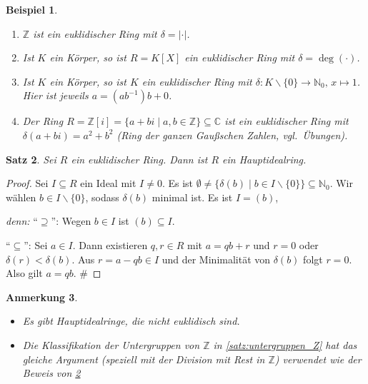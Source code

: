 \documentclass[a4paper, twoside, 11pt, ngerman]{report}
\newcommand{\CC}{\mathds C}
\newcommand{\NN}{\mathds N}
\newcommand{\ZZ}{\mathds Z}
\renewcommand{\setminus}{\smallsetminus}
\theoremstyle{definistyle}
\newtheorem{satz}{Satz}[section]
\newtheorem{anm}[satz]{Anmerkung}
\newtheorem{bsp}[satz]{Beispiel}
\theoremstyle{remark}
\newenvironment{denn}%
  {\par\textit{denn:}}%
  {\hfill\#\par}
\begin{document}
\begin{bsp}\label{bsp:euklidische_ringe}
\begin{enumerate}[label=(\alph*)]
    \item $\ZZ$ ist ein euklidischer Ring mit $\delta = | \cdot |$.
    \item Ist $K$ ein Körper, so ist $R = K[X]$ ein euklidischer Ring mit $\delta = \deg(\cdot)$.
    \item Ist $K$ ein Körper, so ist $K$ ein euklidischer Ring mit $\delta \colon K\setminus\{0\} \to \NN_0, \, x \mapsto 1$. Hier ist jeweils $a = (a b^{-1}) b + 0$.
    \item Der Ring $R = \ZZ[i] = \{a + b i \mid a, b \in \ZZ\} \subseteq \CC$ ist ein euklidischer Ring mit $\delta(a + b i) = a^2 + b^2$ (Ring der ganzen Gaußschen Zahlen, vgl.\ Übungen).
\end{enumerate}
\end{bsp}

\begin{satz}\label{satz:euklidischer_ring_hir}
Sei $R$ ein euklidischer Ring. Dann ist $R$ ein Hauptidealring.
\end{satz}

\begin{proof}
Sei $I \subseteq R$ ein Ideal mit $I \neq 0$. 
Es ist $\emptyset \neq \{\delta(b) \mid b \in I \setminus \{0\}\} \subseteq \NN_0$. Wir wählen $b \in I \setminus \{0\}$, sodass $\delta(b)$ minimal ist. Es ist $I = (b)$,
\begin{denn}
"`$\supseteq$"': Wegen $b \in I$ ist $(b) \subseteq I$. 

"`$\subseteq$"': Sei $a \in I$. Dann existieren $q, r \in R$ mit $a = q b + r$ und $r = 0$ oder $\delta(r) < \delta(b)$. Aus $r = a - q b \in I$ und der Minimalität von $\delta(b)$ folgt $r = 0$. Also gilt $a = q b$.
\end{denn}
\end{proof}

\begin{anm}\label{anm:nicht_euklidische_hir}
\begin{itemize}
    \item Es gibt Hauptidealringe, die nicht euklidisch sind.
    \item Die Klassifikation der Untergruppen von $\ZZ$ in \ref{satz:untergruppen_Z} hat das gleiche Argument (speziell mit der Division mit Rest in $\ZZ$) verwendet wie der Beweis von \ref{satz:euklidischer_ring_hir}
\end{itemize}
\end{anm}
\end{document}
